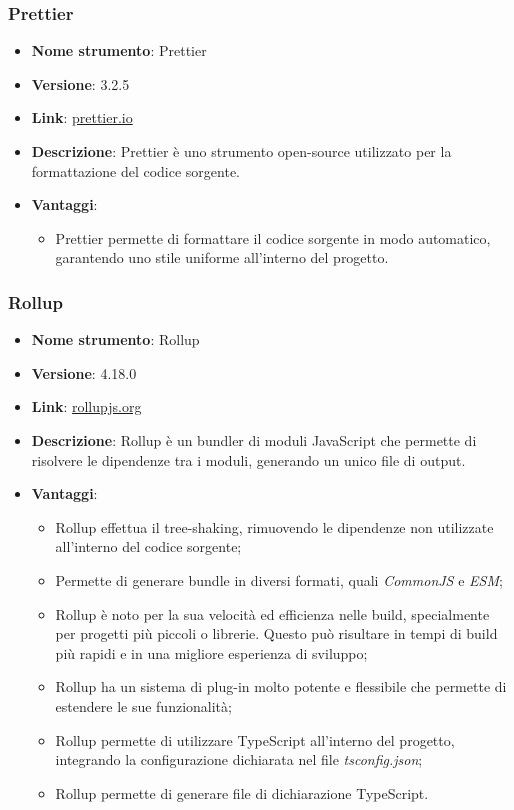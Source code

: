 \subsubsection{Prettier}
\begin{itemize}
      \item \textbf{Nome strumento}: Prettier
      \item \textbf{Versione}: 3.2.5
      \item \textbf{Link}: \href{https://prettier.io/}{prettier.io}
      \item \textbf{Descrizione}: Prettier è uno strumento open-source utilizzato per la formattazione del codice sorgente.
      \item \textbf{Vantaggi}:
            \begin{itemize}
                  \item Prettier permette di formattare il codice sorgente in modo automatico, garantendo uno stile uniforme all'interno del progetto.
            \end{itemize}
\end{itemize}

\subsubsection{Rollup}
\begin{itemize}
      \item \textbf{Nome strumento}: Rollup
      \item \textbf{Versione}: 4.18.0
      \item \textbf{Link}: \href{https://rollupjs.org/}{rollupjs.org}
      \item \textbf{Descrizione}: Rollup è un bundler di moduli JavaScript che permette di risolvere le dipendenze tra i moduli, generando un unico file di output.
      \item \textbf{Vantaggi}:
            \begin{itemize}
                  \item Rollup effettua il tree-shaking, rimuovendo le dipendenze non utilizzate all'interno del codice sorgente;
                  \item Permette di generare bundle in diversi formati, quali \textit{CommonJS} e \textit{ESM};
                  \item Rollup è noto per la sua velocità ed efficienza nelle build, specialmente per progetti più piccoli o librerie.
                        Questo può risultare in tempi di build più rapidi e in una migliore esperienza di sviluppo;
                  \item Rollup ha un sistema di plug-in molto potente e flessibile che permette di estendere le sue funzionalità;
                  \item Rollup permette di utilizzare TypeScript all'interno del progetto, integrando la configurazione dichiarata nel file \textit{tsconfig.json};
                  \item Rollup permette di generare file di dichiarazione TypeScript.
            \end{itemize}
\end{itemize}

